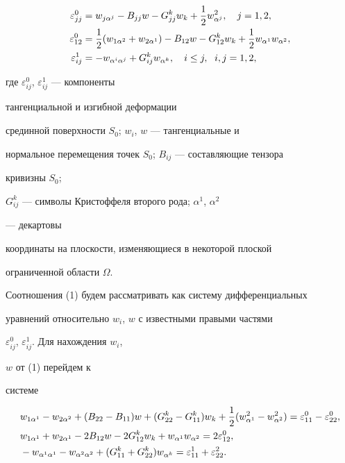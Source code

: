 \begin{align} 


\varepsilon^0_{jj}&=w_{j\alpha^j}-B_{jj}w-G^k_{jj}w_k+ 


\frac{1}{2}w^2_{\alpha^j},\quad j=1,2,\notag\\ 


\varepsilon^0_{12}&=\frac{1}{2}(w_{1\alpha^2}+w_{2\alpha^1})- 


B_{12}w-G^k_{12}w_k+\frac{1}{2}w_{\alpha^1}w_{\alpha^2},\\ 


\varepsilon^1_{ij}&=-w_{\alpha^i\alpha^j}+G^k_{ij}w_{\alpha^k}, 


\quad i\le j,\ \;i,j=1,2,\notag 


\end{align} 


где $\varepsilon^0_{ij}$, $\varepsilon^1_{ij}$ --- компоненты 


тангенциальной и изгибной деформации 


срединной поверхности $S_0$; $w_i$, $w$ --- тангенциальные и 


нормальное перемещения точек $S_0$; $B_{ij}$ --- составляющие тензора 


кривизны $S_0$; 


$G^k_{ij}$ --- символы Кристоффеля второго рода; $\alpha^1$, $\alpha^2$ 


--- декартовы 


координаты на плоскости, изменяющиеся в некоторой плоской  


ограниченной области $\Omega$. 


 


Соотношения (1) будем рассматривать как систему дифференциальных  


уравнений относительно $w_i$, $w$ с известными правыми частями 


$\varepsilon^0_{ij}$, $\varepsilon^1_{ij}$. Для нахождения $w_i$, 


$w$ от (1) перейдем к 


системе 


\begin{align} 


&w_{1\alpha^1}-w_{2\alpha^2}+(B_{22}-B_{11})w+ 


(G^k_{22}-G^k_{11})w_k+\frac{1}{2}(w^2_{\alpha^1}-w^2_{\alpha^2})= 


\varepsilon^0_{11}-\varepsilon^0_{22},\notag \\ 


%


&w_{1\alpha^1}+w_{2\alpha^1}-2B_{12}w-2G^k_{12}w_k+


w_{\alpha^1}w_{\alpha^2}= 2\varepsilon^0_{12},\\


%


&-w_{\alpha^1\alpha^1}-w_{\alpha^2\alpha^2}+(G^k_{11}+G^k_{22})


w_{\alpha^k}=\varepsilon^1_{11}+\varepsilon^2_{22}. 


\end{align} 


